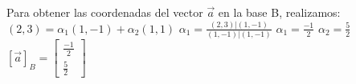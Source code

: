 \documentclass[preview]{standalone}
\begin{document}
\begin{center}
Para obtener las coordenadas del vector $\vec{a}$ en la base B, realizamos:  $(2,3) = \alpha_1 (1, -1) + \alpha_2 (1, 1)$ $\alpha_1 = \frac{(2,3)|(1,-1)}{(1, -1) | (1, -1)}$ $\alpha_1 = \frac{-1}{2}$ $\alpha_2 = \frac{5}{2}$ $[\vec{a}]_B = \begin{bmatrix} \frac{-1}{2} \\ \frac{5}{2} \end{bmatrix}$
\end{center}
\end{document}
